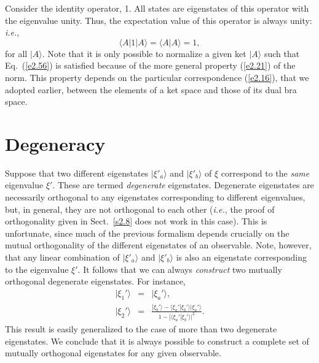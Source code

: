 Consider the identity operator, 1. All states are eigenstates of this operator
with the eigenvalue unity. Thus, the expectation value of this operator
is always unity: {\em i.e.},
\begin{equation}\label{e2.56}
\langle A|1|A\rangle = \langle A|A\rangle =1,
\end{equation}
for all $|A\rangle$. Note that it is only possible to normalize a given
ket $|A\rangle$ such that Eq.~(\ref{e2.56}) is satisfied because of the more general
property (\ref{e2.21}) of the norm. This property depends on the particular correspondence
(\ref{e2.16}), that we adopted earlier, between the elements of a ket space and those of its
dual bra space. 

\section{Degeneracy}
Suppose that two different eigenstates $|\xi'_a\rangle$ and $|\xi'_b\rangle$ 
of $\xi$ 
correspond to the {\em same}\/ eigenvalue $\xi'$. These are termed {\em degenerate}
eigenstates. Degenerate eigenstates are 
necessarily orthogonal to any eigenstates corresponding to
different eigenvalues, but, in general, they are not orthogonal to each other
({\em i.e.}, the proof of orthogonality given in Sect.~\ref{s2.8} does not work in this case).
This is unfortunate, since much of the previous formalism depends crucially
on the mutual orthogonality of the different eigenstates
of an observable. Note, however, that
any linear combination of $|\xi'_a\rangle$ and $|\xi'_b\rangle$ is also
an eigenstate corresponding to the eigenvalue $\xi'$. It follows that we
can always {\em construct} two mutually orthogonal degenerate eigenstates.
For instance,
\begin{eqnarray}
|\xi_1'\rangle &=& |\xi_a'\rangle,\\[0.5ex]
|\xi_2'\rangle&=&\frac{ |\xi_b'\rangle - \langle \xi_a'|\xi_b'\rangle
|\xi_a'\rangle}{1-|\langle \xi_a'|\xi_b'\rangle|^2}.
\end{eqnarray}
This result is easily generalized to the case of more than two degenerate eigenstates.
We conclude that it is always possible to construct a complete set of mutually
orthogonal eigenstates for any given observable.

